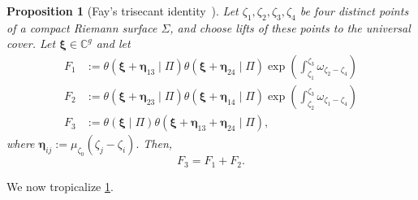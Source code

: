 \documentclass[12pt]{amsart}
\numberwithin{equation}{section}
\newtheorem{proposition}[theorem]{Proposition}
\theoremstyle{definition}
\newcommand{\C}{\mathbb{C}}
\def\vecptjac{\bm{\xi}}
\def\ptSig{\zeta}
\def\basept{{\ptSig_0}}
\def\mcurve{\Sigma}
\begin{document}
\begin{proposition}[{Fay's trisecant identity~\cite[p.~34, Eq.~(45)]{Fay}}]
\label{prop:fay_third_kind}
Let
$
\ptSig_1,\ptSig_2,\ptSig_3,\ptSig_4
$
be four distinct points of a compact Riemann surface $\mcurve$, and choose
lifts of these points to the universal cover. Let $\vecptjac \in\C^g$ and let
\[
\begin{aligned}
F_1&:=
\theta(\vecptjac+\bm \eta_{13}\mid\Pi)
\theta(\vecptjac+\bm \eta_{24}\mid\Pi)
\exp\left(
\int_{\ptSig_1}^{\ptSig_3}
\omega_{\ptSig_2-\ptSig_4}
\right)
\\
F_2&:=
\theta(\vecptjac+\bm \eta_{23}\mid\Pi)
\theta(\vecptjac+\bm \eta_{14}\mid\Pi)
\exp\left(
\int_{\ptSig_2}^{\ptSig_3}
\omega_{\ptSig_1-\ptSig_4}
\right)
\\
F_3&:=
\theta(\vecptjac\mid\Pi)
\theta(
\vecptjac+\bm \eta_{13}+\bm \eta_{24}
\mid\Pi),
\end{aligned}
\]
where $\bm \eta_{ij}
:=
\mu_{\basept}(\ptSig_j-\ptSig_i).$ Then, \[F_3=F_1+F_2.\]
\end{proposition}

We now tropicalize \cref{prop:fay_third_kind}. 
\end{document}
